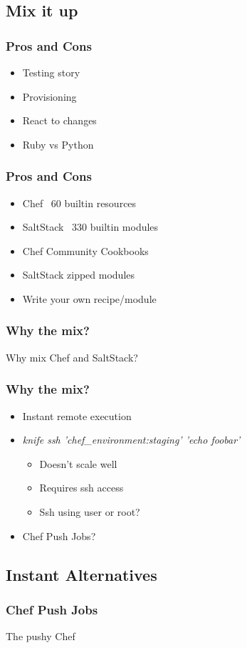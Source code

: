 \subsection{Mix it up}
\frame
{
  \frametitle{Pros and Cons}

  \begin{itemize}
  \item<1-> Testing story
  \item<2-> Provisioning
  \item<3-> React to changes
  \item<4-> Ruby vs Python
  \end{itemize}
}

\frame
{
  \frametitle{Pros and Cons}

  \begin{itemize}
  \item<1-> Chef ~60 builtin resources
  \item<2-> SaltStack ~330 builtin modules
  \item<3-> Chef Community Cookbooks
  \item<4-> SaltStack zipped modules
  \item<5-> Write your own recipe/module
  \end{itemize}
}

\frame
{
  \frametitle{Why the mix?}
  \begin{center}
    Why mix Chef and SaltStack?
  \end{center}
}

\frame
{
  \frametitle{Why the mix?}

  \begin{itemize}
  \item<1-> Instant remote execution
  \item<2-> \textit{knife ssh 'chef\_environment:staging' 'echo foobar'}
  \begin{itemize}
    \item<3-> Doesn't scale well
    \item<4-> Requires ssh access
    \item<5-> Ssh using user or root?
  \end{itemize}
  \item<6-> Chef Push Jobs?
  \end{itemize}
}

\subsection{Instant Alternatives}
\frame
{
  \frametitle{Chef Push Jobs}
  \begin{center}
    The pushy Chef
  \end{center}
}

